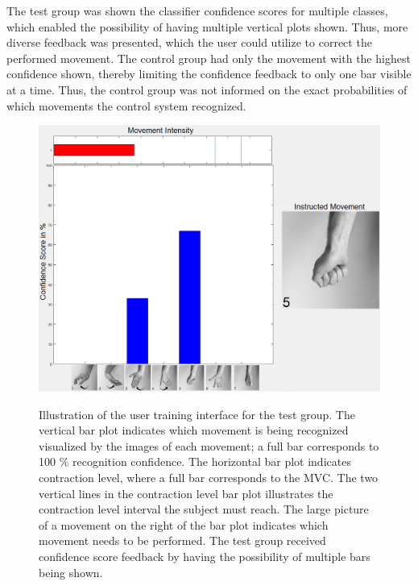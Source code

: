The test group was shown the classifier confidence scores for multiple classes, which enabled the possibility of having multiple vertical plots shown. Thus, more diverse feedback was presented, which the user could utilize to correct the performed movement. The control group had only the movement with the highest confidence shown, thereby limiting the confidence feedback to only one bar visible at a time. Thus, the control group was not informed on the exact probabilities of which movements the control system recognized.  

\begin{figure}[H]
	\includegraphics[width=.47\textwidth]{figures/xBackground/usertraintestGUI} \\
	\caption{Illustration of the user training interface for the test group. The vertical bar plot indicates which movement is being recognized visualized by the images of each movement; a full bar corresponds to 100 \% recognition confidence. The horizontal bar plot indicates contraction level, where a full bar corresponds to the MVC. The two vertical lines in the contraction level bar plot illustrates the contraction level interval the subject must reach. The large picture of a movement on the right of the bar plot indicates which movement needs to be performed. The test group received confidence score feedback by having the possibility of multiple bars being shown.}
	\label{fig:test}
\end{figure}    


